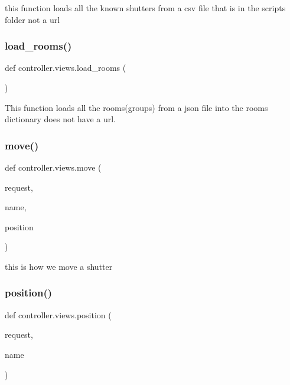 this function loads all the known shutters from a csv file that is in the scripts folder not a url 

\mbox{\label{namespacecontroller_1_1views_a7d95618cd1b42c41c244c565d20fed55}} 
\subsubsection{\texorpdfstring{load\+\_\+rooms()}{load\_rooms()}}
{\footnotesize\ttfamily def controller.\+views.\+load\+\_\+rooms (\begin{DoxyParamCaption}{ }\end{DoxyParamCaption})}



This function loads all the rooms(groups) from a json file into the rooms dictionary does not have a url. 

\mbox{\label{namespacecontroller_1_1views_a155af175864fbdf91a8f42e7c7683790}} 
\subsubsection{\texorpdfstring{move()}{move()}}
{\footnotesize\ttfamily def controller.\+views.\+move (\begin{DoxyParamCaption}\item[{}]{request,  }\item[{}]{name,  }\item[{}]{position }\end{DoxyParamCaption})}



this is how we move a shutter 

\mbox{\label{namespacecontroller_1_1views_af4a1b79435d815cad6aa25c3c45aa080}} 
\subsubsection{\texorpdfstring{position()}{position()}}
{\footnotesize\ttfamily def controller.\+views.\+position (\begin{DoxyParamCaption}\item[{}]{request,  }\item[{}]{name }\end{DoxyParamCaption})}



